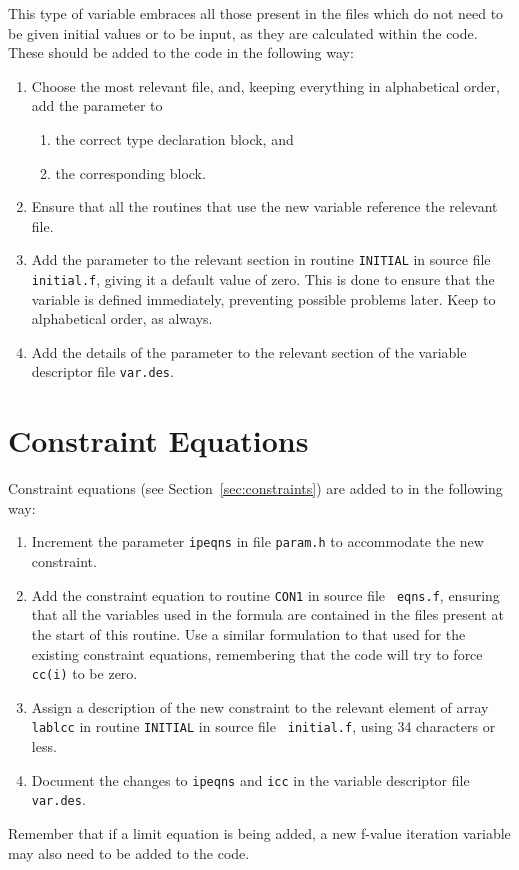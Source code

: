 This type of variable embraces all those present in the \INCLUDE files
which do not need to be given initial values or to be input, as they
are calculated within the code. These should be added to the code in
the following way:
\begin{enumerate}
\item
Choose the most relevant \INCLUDE file, and, keeping everything in
alphabetical order, add the parameter to
\begin{enumerate}
\item
the correct type declaration block, and
\item
the corresponding \COMMON block.
\end{enumerate}
\item
Ensure that all the routines that use the new variable reference the
relevant \INCLUDE file.
\item
Add the parameter to the relevant section in routine {\tt INITIAL} in
source file {\tt initial.f}, giving it a default value of zero. This
is done to ensure that the variable is defined immediately, preventing
possible problems later. Keep to alphabetical order, as always.
\item
Add the details of the parameter to the relevant section of the
variable descriptor file {\tt var.des}.
\end{enumerate}

\section{Constraint Equations}

Constraint equations (see Section~\ref{sec:constraints}) are added to
\PS in the following way:
\begin{enumerate}
\item
Increment the parameter {\tt ipeqns} in \INCLUDE file {\tt param.h} to
accommodate the new constraint.
\item
Add the constraint equation to routine {\tt CON1} in source file {\tt
eqns.f}, ensuring that all the variables used in the formula are
contained in the \INCLUDE files present at the start of this routine.
Use a similar formulation to that used for the existing constraint
equations, remembering that the code will try to force {\tt cc(i)} to
be zero.
\item
Assign a description of the new constraint to the relevant element of
array {\tt lablcc} in routine {\tt INITIAL} in source file {\tt
initial.f}, using 34 characters or less.
\item
Document the changes to {\tt ipeqns} and {\tt icc} in the variable
descriptor file {\tt var.des}.
\end{enumerate}
Remember that if a limit equation is being added, a new f-value
iteration variable may also need to be added to the code.

